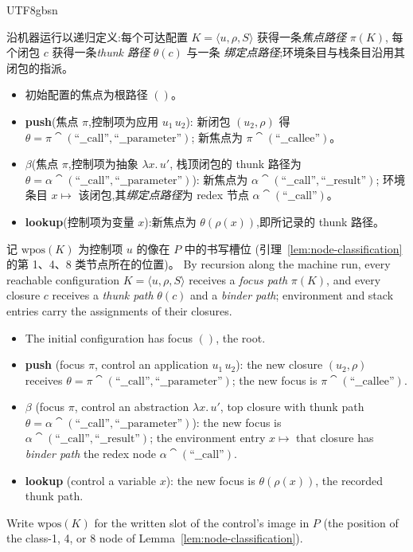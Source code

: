 \begin{CJK*}{UTF8}{gbsn}
\begin{definition}\label{def:config-paths}
  \ifPaperChinese
  沿机器运行以递归定义:每个可达配置
  $K = \langle u, \rho, S \rangle$ 获得一条\emph{焦点路径} $\pi(K)$,
  每个闭包 $c$ 获得一条\emph{thunk 路径} $\theta(c)$ 与一条
  \emph{绑定点路径};环境条目与栈条目沿用其闭包的指派。
  \begin{itemize}
    \item 初始配置的焦点为根路径 $()$。
    \item \textbf{push}(焦点 $\pi$,控制项为应用 $u_1\, u_2$):
      新闭包 $(u_2, \rho)$ 得
      $\theta = \pi \cat (\text{``\_\_call''}, \text{``\_\_parameter''})$;
      新焦点为 $\pi \cat (\text{``\_\_callee''})$。
    \item \begin{sloppypar}\textbf{$\beta$}(焦点 $\pi$,控制项为抽象 $\lambda x.\, u'$,
      栈顶闭包的 thunk 路径为
      $\theta = \alpha \cat (\text{``\_\_call''},\allowbreak \text{``\_\_parameter''})$):
      新焦点为 $\alpha \cat (\text{``\_\_call''}, \text{``\_\_result''})$;
      环境条目 $x \mapsto$ 该闭包,其\emph{绑定点路径}为 redex 节点
      $\alpha \cat (\text{``\_\_call''})$。
      \end{sloppypar}
    \item \textbf{lookup}(控制项为变量 $x$):新焦点为
      $\theta(\rho(x))$,即所记录的 thunk 路径。
  \end{itemize}
  记 $\mathrm{wpos}(K)$ 为控制项 $u$ 的像在 $P$ 中的书写槽位
  (引理~\ref{lem:node-classification} 的第 1、4、8 类节点所在的位置)。
  \else
  By recursion along the machine run, every reachable configuration
  $K = \langle u, \rho, S \rangle$ receives a \emph{focus path}
  $\pi(K)$, and every closure $c$ receives a \emph{thunk path}
  $\theta(c)$ and a \emph{binder path}; environment and stack entries
  carry the assignments of their closures.
  \begin{itemize}
    \item The initial configuration has focus $()$, the root.
    \item \textbf{push} (focus $\pi$, control an application
      $u_1\, u_2$): the new closure $(u_2, \rho)$ receives
      $\theta = \pi \cat (\text{``\_\_call''}, \text{``\_\_parameter''})$;
      the new focus is $\pi \cat (\text{``\_\_callee''})$.
    \item \textbf{$\beta$} (focus $\pi$, control an abstraction
      $\lambda x.\, u'$, top closure with thunk path
      $\theta = \alpha \cat (\text{``\_\_call''},\allowbreak \text{``\_\_parameter''})$):
      the new focus is
      $\alpha \cat (\text{``\_\_call''}, \text{``\_\_result''})$; the
      environment entry $x \mapsto$ that closure has \emph{binder
      path} the redex node $\alpha \cat (\text{``\_\_call''})$.
    \item \textbf{lookup} (control a variable $x$): the new focus is
      $\theta(\rho(x))$, the recorded thunk path.
  \end{itemize}
  Write $\mathrm{wpos}(K)$ for the written slot of the control's image
  in $P$ (the position of the class-1, 4, or 8 node of
  Lemma~\ref{lem:node-classification}).
  \fi
\end{definition}


\end{CJK*}
